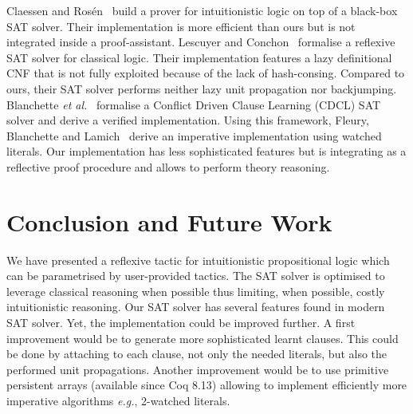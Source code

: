 \documentclass[utf8,a4paper,UKenglish,cleveref, autoref, thm-restate]{lipics-v2019}
\begin{document}
Claessen and Ros{\'{e}}n~\cite{ClaessenR15} build a prover for
intuitionistic logic on top of a black-box SAT solver. Their
implementation is more efficient than ours but is not integrated
inside a proof-assistant. 
% 
Lescuyer and
Conchon~\cite{lescuyer08tphol,LescuyerC09} formalise a reflexive SAT
solver for classical logic. Their implementation features a lazy
definitional CNF that is not fully exploited because of the lack of
hash-consing. Compared to ours, their SAT solver performs neither lazy
unit propagation nor backjumping.
%
Blanchette \emph{et al.}~\cite{BlanchetteFLW18} formalise a Conflict
Driven Clause Learning (CDCL) SAT solver and derive a verified
implementation. Using this framework, Fleury, Blanchette and
Lamich~\cite{FleuryBL18} derive an imperative implementation using
watched literals. Our implementation has less sophisticated features
but is integrating as a reflective proof procedure and allows to
perform theory reasoning.



\section{Conclusion and Future Work}
\label{sec:conclusion}

We have presented  a reflexive tactic for intuitionistic
propositional logic which can be parametrised by user-provided tactics.
%
The SAT solver is optimised to leverage classical reasoning when
possible thus limiting, when possible, costly intuitionistic reasoning.
%
Our SAT solver has several features found in modern SAT solver. Yet,
the implementation could be improved further. A first improvement
would be to generate more sophisticated learnt clauses. This could be
done by attaching to each clause, not only the needed literals, but
also the performed unit propagations. Another improvement would
be to use primitive persistent arrays (available since Coq 8.13)
allowing to implement efficiently more imperative algorithms
\emph{e.g.},  2-watched literals.





\end{document}
